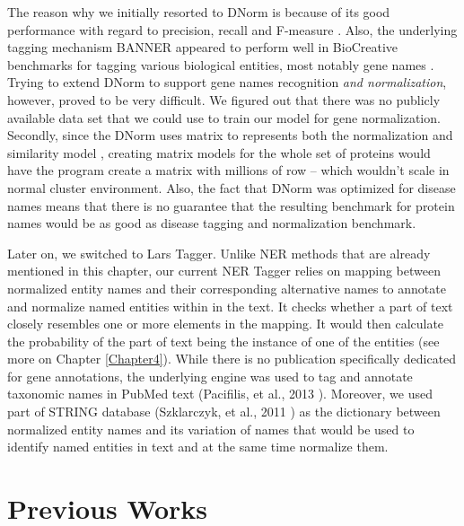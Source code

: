 The reason why we initially resorted to DNorm is because of its good performance with regard to precision, recall and F-measure \citep{leaman2013dnorm}. Also, the underlying tagging mechanism BANNER appeared to perform well in BioCreative benchmarks for tagging various biological entities, most notably gene names \citep{smith2008overview} \citep{leaman2008banner}. Trying to extend DNorm to support gene names recognition \textit{and normalization}, however, proved to be very difficult. We figured out that there was no publicly available data set that we could use to train our model for gene normalization. Secondly, since the DNorm uses matrix to represents both the normalization and similarity model \citep{leaman2013dnorm}, creating matrix models for the whole set of proteins would have the program create a matrix with millions of row -- which wouldn't scale in normal cluster environment. Also, the fact that DNorm was optimized for disease names means that there is no guarantee that the resulting benchmark for protein names would be as good as disease tagging and normalization benchmark.

Later on, we switched to Lars Tagger. Unlike NER methods that are already mentioned in this chapter, our current NER Tagger relies on mapping between normalized entity names and their corresponding alternative names to annotate and normalize named entities within in the text. It checks whether a part of text closely resembles one or more elements in the mapping. It would then calculate the probability of the part of text being the instance of one of the entities (see more on Chapter \ref{Chapter4}). While there is no publication specifically dedicated for gene annotations, the underlying engine was used to tag and annotate taxonomic names in PubMed text (Pacifilis, et al., 2013 \citep{pafilis2013species}). Moreover, we used part of STRING database (Szklarczyk, et al., 2011 \citep{szklarczyk2011string}) as the dictionary between normalized entity names and its variation of names that would be used to identify named entities in text and at the same time normalize them.


\section{Previous Works}

